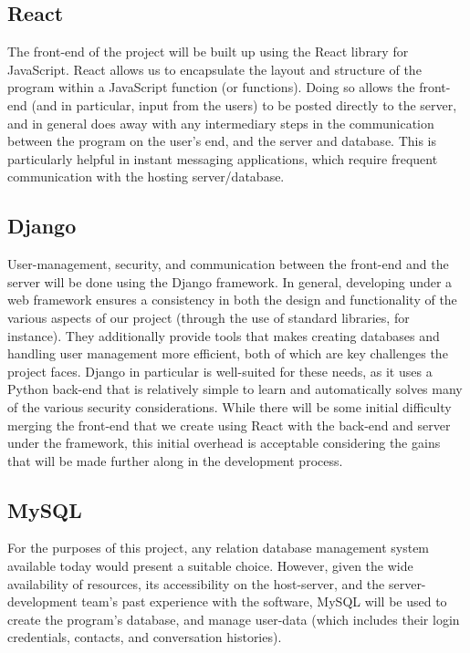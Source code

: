 \documentclass[11pt]{article}
\begin{document}
\subsection{React}
The front-end of the project will be built up using the React library for JavaScript. React
allows us to encapsulate the layout and structure of the program within a JavaScript function (or
functions). Doing so allows the front-end (and in particular, input from the users) to be posted
directly to the server, and in general does away with any intermediary steps in the communication
between the program on the user's end, and the server and database. This is particularly helpful in
instant messaging applications, which require frequent communication with the hosting
server/database.

\subsection{Django}
User-management, security, and communication between the front-end and the server will be done using
the Django framework. In general, developing under a web framework ensures a consistency in both the
design and functionality of the various aspects of our project (through the use of standard
libraries, for instance). They additionally provide tools that makes creating databases and handling
user management more efficient, both of which are key challenges the project faces. Django in
particular is well-suited for these needs, as it uses a Python back-end that is relatively simple to
learn and automatically solves many of the various security considerations. While there will be some
initial difficulty merging the front-end that we create using React with the back-end and server
under the framework, this initial overhead is acceptable considering the gains that will be made
further along in the development process.

\subsection{MySQL}
For the purposes of this project, any relation database management system available today would
present a suitable choice. However, given the wide availability of resources, its accessibility on
the host-server, and the server-development team's past experience with the software, MySQL will be
used to create the program's database, and manage user-data (which includes their login credentials,
contacts, and conversation histories).
\end{document}
